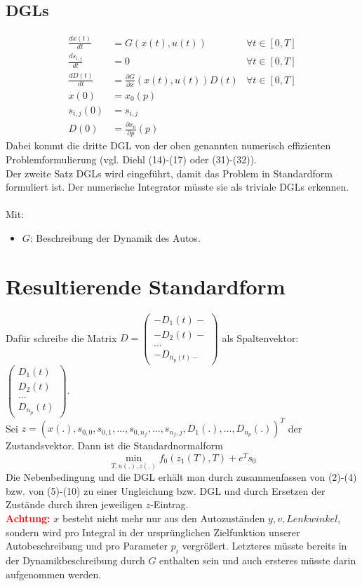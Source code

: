 \documentclass[12pt,a4paper]{article}
\theoremstyle{definition}
\theoremstyle{plain}
\begin{document}
\subsection*{DGLs}
\begin{align}
\frac{dx(t)}{dt}&= G(x(t), u(t)) & \forall t\in [0,T]\\
\frac{ds_{i,j}}{dt}&= 0 & \forall t\in [0,T]\\
\frac{dD(t)}{dt}&= \frac{\partial G}{\partial x}(x(t), u(t))D(t) & \forall t\in [0,T]\\
x(0)&= x_{0}(p) &\\
s_{i,j}(0)&= s_{i,j} &\\
D(0)&= \frac{\partial x_{0}}{\partial p}(p) &
\end{align}
Dabei kommt die dritte DGL von der oben genannten numerisch effizienten Problemformulierung (vgl. Diehl (14)-(17) oder (31)-(32)).\\
Der zweite Satz DGLs wird eingeführt, damit das Problem in Standardform formuliert ist. Der numerische Integrator müsste sie als triviale DGLs erkennen.\\
\\
Mit:
\begin{itemize}
	\item $G$: Beschreibung der Dynamik des Autos.
	
\end{itemize}



\section{Resultierende Standardform}
Dafür schreibe die Matrix $D=\left(\begin{array}{c}
-D_{1}(t)-\\
-D_{2}(t)-\\
...\\
-D_{n_{p}(t)-}
\end{array}\right)$ als Spaltenvektor: $\left(\begin{array}{c}
D_{1}(t)\\
D_{2}(t)\\
...\\
D_{n_{p}}(t)
\end{array}\right)$.\\
Sei $z=(x(.), s_{0,0}, s_{0,1},..., s_{0, n_{f}},..., s_{n_{f},j}, D_{1}(.),..., D_{n_{p}}(.))^{T}$ der Zustandsvektor. Dann ist die Standardnormalform
\begin{equation}
\min_{T, u(.),z(.)} f_{0}(z_{1}(T), T)+e^{T}s_{0}
\end{equation}
Die Nebenbedingung und die DGL erhält man durch zusammenfassen von (2)-(4) bzw. von (5)-(10) zu einer Ungleichung bzw. DGL und durch Ersetzen der Zustände durch ihren jeweiligen $z$-Eintrag.\\ 

\textcolor{red}{\textbf{Achtung:}} $x$ besteht nicht mehr nur aus den Autozuständen $y,v,Lenkwinkel$, sondern wird pro Integral in der ursprünglichen Zielfunktion unserer Autobeschreibung und pro Parameter $p_{i}$ vergrößert. Letzteres müsste bereits in der Dynamikbeschreibung durch $G$ enthalten sein und auch ersteres müsste darin aufgenommen werden.
\end{document}
